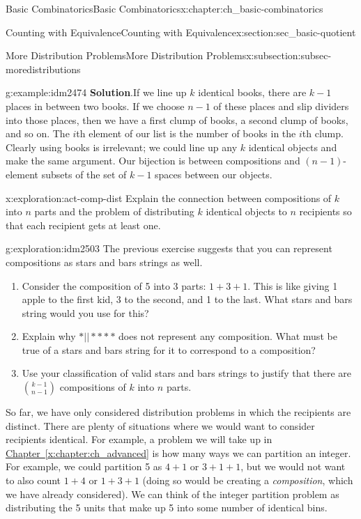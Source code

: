 \documentclass[oneside,10pt,]{book}
\numberwithin{equation}{chapter}
\begin{document}
\begin{chapterptx}{Basic Combinatorics}{}{Basic Combinatorics}{}{}{x:chapter:ch_basic-combinatorics}
\begin{sectionptx}{Counting with Equivalence}{}{Counting with Equivalence}{}{}{x:section:sec_basic-quotient}
\begin{subsectionptx}{More Distribution Problems}{}{More Distribution Problems}{}{}{x:subsection:subsec-moredistributions}
\begin{example}{}{g:example:idm2474}
\noindent\textbf{Solution}.\hypertarget{g:solution:idm2480}{}\quad{}If we line up \(k\) identical books, there are \(k-1\) places in between two books. If we choose \(n-1\) of these places and slip dividers into those places, then we have a first clump of books, a second clump of books, and so on. The \(i\)th element of our list is the number of books in the \(i\)th clump. Clearly using books is irrelevant; we could line up any \(k\) identical objects and make the same argument. Our bijection is between compositions and \((n-1)\)-element subsets of the set of \(k-1\) spaces between our objects.%
\end{example}
\begin{exploration}{}{x:exploration:act-comp-dist}%
Explain the connection between compositions of \(k\) into \(n\) parts and the problem of distributing \(k\) identical objects to \(n\) recipients so that each recipient gets at least one.%
\end{exploration}
\begin{exploration}{}{g:exploration:idm2503}%
The previous exercise suggests that you can represent compositions as stars and bars strings as well.%
\begin{enumerate}[font=\bfseries,label=(\alph*),ref=\alph*]
\item{}Consider the composition of 5 into 3 parts: \(1+3+1\).  This is like giving 1 apple to the first kid, 3 to the second, and 1 to the last.  What stars and bars string would you use for this?%
\item{}Explain why \(*||****\) does not represent any composition.  What must be true of a stars and bars string for it to correspond to a composition?%
\item{}Use your classification of valid stars and bars strings to justify that there are \(\binom{k-1}{n-1}\) compositions of \(k\) into \(n\) parts.%
\end{enumerate}
\end{exploration}
So far, we have only considered distribution problems in which the recipients are distinct.  There are plenty of situations where we would want to consider recipients identical.  For example, a problem we will take up in \hyperref[x:chapter:ch_advanced]{Chapter~\ref{x:chapter:ch_advanced}} is how many ways we can partition an integer.  For example, we could partition 5 as \(4+1\) or \(3+1+1\), but we would not want to also count \(1+4\) or \(1+3+1\) (doing so would be creating a \emph{composition}, which we have already considered).  We can think of the integer partition problem as distributing the 5 units that make up 5 into some number of identical bins.%

\end{subsectionptx}
\end{sectionptx}
\end{chapterptx}
\end{document}
